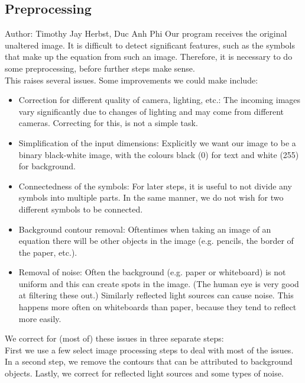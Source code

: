 \documentclass[12pt]{article}
\begin{document}
	\subsection{Preprocessing}
	\small{Author: Timothy Jay Herbst, Duc Anh Phi} \newline \newline
	Our program receives the original unaltered image.
	It is difficult to detect significant features, such as the symbols that make up the equation from such an image.
	Therefore, it is necessary to do some preprocessing, before further steps make sense.\\
	This raises several issues.
	Some improvements we could make include:\\
	\begin{itemize}
		\item Correction for different quality of camera, lighting, etc.:
		The incoming images vary significantly due to changes of lighting and may come from different cameras.
		Correcting for this, is not a simple task.
		\item Simplification of the input dimensions: Explicitly we want our image to be a binary black-white image, with the colours black (0) for text and white (255) for background.
		\item Connectedness of the symbols: For later steps, it is useful to not divide any symbols into multiple parts. In the same manner, we do not wish for two different symbols to be connected.
		\item Background contour removal: Oftentimes when taking an image of an equation there will be other objects in the image (e.g. pencils, the border of the paper, etc.).
		\item Removal of noise: Often the background (e.g. paper or whiteboard) is not uniform and this can create spots in the image. (The human eye is very good at filtering these out.)
		Similarly reflected light sources can cause noise.
		This happens more often on whiteboards than paper, because they tend to reflect more easily. %
	\end{itemize}
		We correct for (most of) these issues in three separate steps:\\
		First we use a few select image processing steps to deal with most of the issues.
		In a second step, we remove the contours that can be attributed to background objects.
		Lastly, we correct for reflected light sources and some types of noise.
\end{document}

